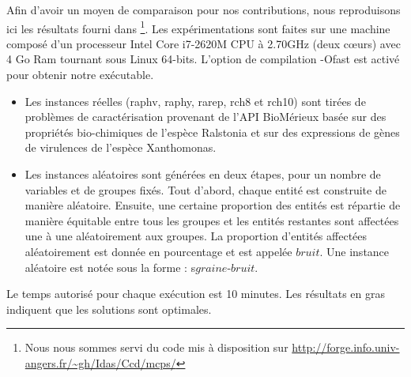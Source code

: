 Afin d'avoir un moyen de comparaison pour nos contributions, nous reproduisons ici les résultats fourni dans \cite{Chhel2013}\footnote{Nous nous sommes servi du code mis à disposition sur \url{http://forge.info.univ-angers.fr/~gh/Idas/Ccd/mcps/}}. Les expérimentations sont faites sur une machine composé d'un processeur Intel Core i7-2620M CPU à 2.70GHz (deux cœurs) avec 4 Go Ram tournant sous Linux 64-bits. L'option de compilation -Ofast est activé pour obtenir notre exécutable.
\begin{itemize}
\item Les instances réelles (raphv, raphy, rarep, rch8 et rch10) sont tirées de problèmes de caractérisation provenant de l'API BioMérieux basée sur des propriétés bio-chimiques de l'espèce Ralstonia et sur des expressions de gènes de virulences de l'espèce Xanthomonas.
\item Les instances aléatoires sont générées en deux étapes, pour un nombre de variables et de groupes fixés. Tout d'abord, chaque entité est construite de manière aléatoire. Ensuite, une certaine proportion des entités est répartie de manière équitable entre tous les groupes et les entités
restantes sont affectées une à une aléatoirement aux groupes. La proportion
d'entités affectées aléatoirement est donnée en pourcentage et est appelée
$bruit$. Une instance aléatoire est notée sous la forme : s$graine$-$bruit$.
\end{itemize}
Le temps autorisé pour chaque exécution est 10 minutes. Les résultats en gras indiquent que les solutions sont optimales.
